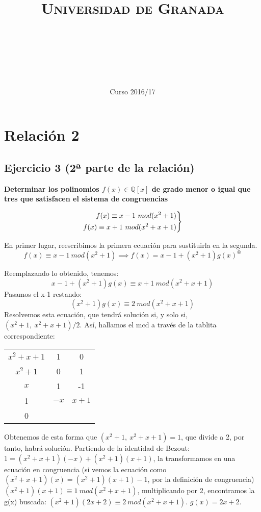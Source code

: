 \documentclass[11pt, a4paper, titlepage]{article}
\title{
  \normalfont \normalsize 
  \textsc{Universidad de Granada} \\ [25pt]    %
  \horrule{0.5pt} \\[0.4cm] %
  \huge \subject\\ %
  \horrule{2pt} \\[0.5cm] %
}
\author{\Large{\docauthor}}
\date{\vspace{-1.5em} \normalsize Curso 2016/17}
\providecommand{\rac}{\mathbb{Q}}
\newenvironment{rcases}
  {\left.\begin{aligned}}
  {\end{aligned}\right\rbrace}
\begin{document}
\maketitle

\section{\Huge{Relación 2}}

\subsection{\LARGE{Ejercicio 3 (2ª parte de la relación)}}

\textbf{Determinar los polinomios $f(x) \in \rac [x]$ de grado menor o igual que tres que satisfacen el sistema de congruencias}

\[
\begin{rcases}
	f(x) \equiv x - 1\ mod(x^2+1)\\
	f(x) \equiv x + 1\ mod(x^2+x+1)
\end{rcases}
\]

En primer lugar, reescribimos la primera ecuación para sustituirla en la segunda. 
$$f(x) \equiv x - 1\ mod(x^2+1) \implies f(x) = x-1 + (x^2+1)g(x)^\circledast$$

Reemplazando lo obtenido, tenemos:
$$x-1 + (x^2+1)g(x) \equiv x+1\ mod(x^2+x+1)$$ 
Pasamos el x-1 restando:
$$(x^2+1)g(x) \equiv 2\ mod(x^2+x+1)$$
Resolvemos esta ecuación, que tendrá solución si, y solo si, $(x^2+1,\ x^2+x+1)/2$. Así, hallamos el mcd a través de la tablita correspondiente:


\begin{center}
\begin{tabular}{c|cc}
$x^2+x+1$ & 1 & 0 \\
$x^2+1$ & 0 & 1 \\
$x$ & 1 & -1 \\
1 & $-x$ & $x+1$\\
0
\end{tabular}
\end{center}

Obtenemos de esta forma que $(x^2+1,\ x^2+x+1) = 1$, que divide a 2, por tanto, habrá solución. Partiendo de la identidad de Bezout: $1 = (x^2+x+1)(-x) + (x^2+1)(x+1)$, la transformamos en una ecuación en congruencia (si vemos la ecuación como $(x^2+x+1)(x) = (x^2+1)(x+1) - 1$, por la definición de congruencia) $(x^2+1)(x+1) \equiv 1\ mod(x^2+x+1)$, multiplicando por 2, encontramos la g(x) buscada: $(x^2+1)(2x+2) \equiv 2\ mod(x^2+x+1)$.
$g(x)=2x+2$.
\end{document}

